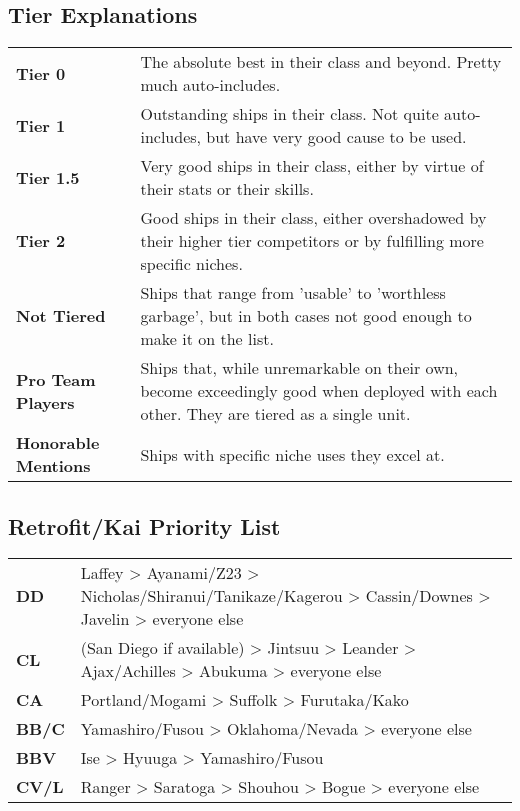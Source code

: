 \subsection{Tier Explanations}
\renewcommand{\arraystretch}{1.3} %
\begin{tabularx}{\textwidth}{>{\bfseries}lX}
    Tier 0               & The absolute best in their class and beyond. Pretty much auto-includes.\\
    Tier 1               & Outstanding ships in their class. Not quite auto-includes, but have very good cause to be used.\\
    Tier 1.5             & Very good ships in their class, either by virtue of their stats or their skills.\\
    Tier 2               & Good ships in their class, either overshadowed by their higher tier competitors or by fulfilling more specific niches.\\
    Not Tiered		 & Ships that range from 'usable' to 'worthless garbage', but in both cases not good enough to make it on the list.\\
    Pro Team Players     & Ships that, while unremarkable on their own, become exceedingly good when deployed with each other. They are tiered as a single unit.\\
    Honorable Mentions   & Ships with specific niche uses they excel at.
\end{tabularx}
 

\subsection{Retrofit/Kai Priority List}
\begin{tabularx}{\textwidth}{>{\bfseries}lX}
DD                  & Laffey > Ayanami/Z23 > Nicholas/Shiranui/Tanikaze/Kagerou > Cassin/Downes > Javelin > everyone else\\
CL                  & (San Diego if available) > Jintsuu > Leander > Ajax/Achilles > Abukuma > everyone else\\
CA                  & Portland/Mogami > Suffolk > Furutaka/Kako\\
BB/C                & Yamashiro/Fusou > Oklahoma/Nevada > everyone else\\
BBV		    & Ise > Hyuuga > Yamashiro/Fusou\\
CV/L                & Ranger > Saratoga > Shouhou > Bogue > everyone else\\
\end{tabularx}
 

